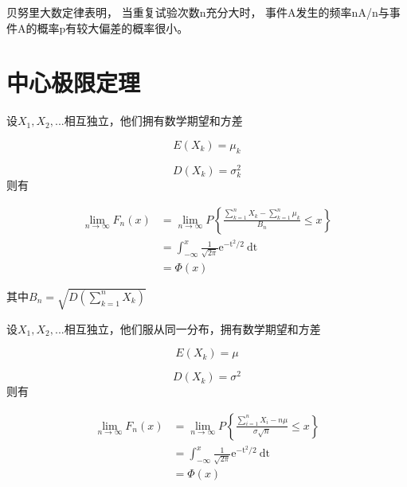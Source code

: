 贝努里大数定律表明， 当重复试验次数n充分大时， 事件A发生的频率nA/n与事件A的概率p有较大偏差的概率很小。

\section{中心极限定理}

\begin{theorem}[Lyapunov中心极限定理]
    设$X_1,X_2,...$相互独立，他们拥有数学期望和方差

\begin{equation}
 E(X_k) = \mu_k
\end{equation}

\begin{equation}
  D(X_k) = \sigma_k^2
\end{equation}
则有

\begin{equation}
\begin{aligned} \lim _{n \rightarrow \infty} F_{n}(x) &=\lim _{n \rightarrow \infty} P\left\{\frac{\sum_{k=1}^{n} X_{k}-\sum_{k=1}^{n} \mu_{k}}{B_{n}} \leq x\right\}
\\ &=\int_{-\infty}^{x} \frac{1}{\sqrt{2 \pi}} \mathrm{e}^{-\mathrm{t}^{2} / 2} \mathrm{~d} \mathrm{t}
\\&=\Phi(x)
 \end{aligned}
 \end{equation}

其中$B_n=\sqrt{D\left(\sum_{k=1}^{n} X_{k}\right)}$
\end{theorem}

\begin{theorem}
    设$X_1,X_2,...$相互独立，他们服从同一分布，拥有数学期望和方差

\begin{equation}
 E(X_k) = \mu
\end{equation}

\begin{equation}
  D(X_k) = \sigma^2
\end{equation}
则有

\begin{equation}\begin{aligned}
\lim _{n \rightarrow \infty} F_{n}(x)&=\lim _{n \rightarrow \infty} P\left\{\frac{\sum_{i=1}^{n} X_{i}-n \mu}{\sigma \sqrt{n}} \leq x\right\}
\\ &=\int_{-\infty}^{x} \frac{1}{\sqrt{2 \pi}} \mathrm{e}^{-\mathrm{t}^{2} / 2} \mathrm{~d} \mathrm{t}
\\&=\Phi(x)
\end{aligned}
\end{equation}
\end{theorem}

